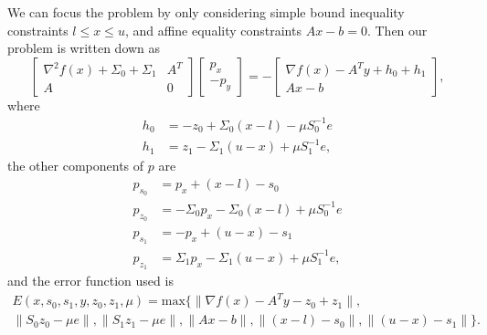 \documentclass{article}
\begin{document}
We can focus the problem by only considering 
    simple bound inequality constraints $l \le x \le u$, and
    affine equality constraints $A x - b = 0$.
Then our problem is written down as
\begin{equation}
\begin{bmatrix}
    \nabla^2 f(x) + \Sigma_0 + \Sigma_1 & A^T \\
    A & 0 
\end{bmatrix}
\begin{bmatrix} p_x \\ -p_y \end{bmatrix}
    = -
\begin{bmatrix}
    \nabla f(x) - A^T y + h_0 + h_1 \\ A x - b
\end{bmatrix},
\end{equation}
where
\begin{align}
h_0 &= -z_0 + \Sigma_0 (x - l) - \mu S_0^{-1} e \\
h_1 &= z_1 - \Sigma_1 (u - x) + \mu S_1^{-1} e, 
\end{align}
the other components of $p$ are
\begin{align}
    p_{s_0} &= p_x + (x - l) - s_0 \\
    p_{z_0} &= -\Sigma_0 p_x - \Sigma_0 (x - l) + \mu S_0^{-1} e \\
    p_{s_1} &= -p_x + (u - x) - s_1 \\
    p_{z_1} &= \Sigma_1 p_x - \Sigma_1 (u - x) + \mu S_1^{-1} e,
\end{align}
and the error function used is
\begin{multline}
E(x, s_0, s_1, y, z_0, z_1, \mu) = \text{max}\{ 
    \| \nabla f(x) - A^T y - z_0 + z_1 \|, \\
    \| S_0 z_0 - \mu e \|, 
    \| S_1 z_1 - \mu e \|, 
    \| A x - b \|, 
    \|(x - l) - s_0 \|, 
    \|(u - x) - s_1 \| \}.
\end{multline}
\end{document}
